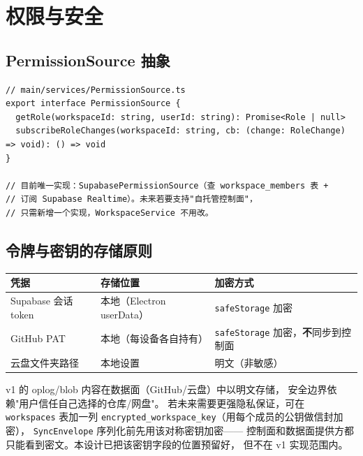 \documentclass[12pt, a4paper]{article}
\begin{document}
\section{权限与安全}

\subsection{PermissionSource 抽象}

\begin{lstlisting}[language={}]
// main/services/PermissionSource.ts
export interface PermissionSource {
  getRole(workspaceId: string, userId: string): Promise<Role | null>
  subscribeRoleChanges(workspaceId: string, cb: (change: RoleChange) => void): () => void
}

// 目前唯一实现：SupabasePermissionSource（查 workspace_members 表 +
// 订阅 Supabase Realtime）。未来若要支持"自托管控制面"，
// 只需新增一个实现，WorkspaceService 不用改。
\end{lstlisting}

\subsection{令牌与密钥的存储原则}

\begin{center}
\begin{tabular}{p{3.5cm} p{4.6cm} p{4.6cm}}
  \toprule
  \textbf{凭据} & \textbf{存储位置} & \textbf{加密方式} \\
  \midrule
  Supabase 会话 token   & 本地（Electron userData） & \texttt{safeStorage} 加密 \\
  GitHub PAT           & 本地（每设备各自持有）    & \texttt{safeStorage} 加密，\textbf{不}同步到控制面 \\
  云盘文件夹路径         & 本地设置                  & 明文（非敏感） \\
  \bottomrule
\end{tabular}
\end{center}

\begin{tcolorbox}[notebox, title={端到端加密（Future Work，非 v1 必须）}]
  v1 的 oplog/blob 内容在数据面（GitHub/云盘）中以明文存储，
  安全边界依赖"用户信任自己选择的仓库/网盘"。
  若未来需要更强隐私保证，可在 \texttt{workspaces} 表加一列
  \texttt{encrypted\_workspace\_key}（用每个成员的公钥做信封加密），
  \texttt{SyncEnvelope} 序列化前先用该对称密钥加密——
  控制面和数据面提供方都只能看到密文。本设计已把该密钥字段的位置预留好，
  但不在 v1 实现范围内。
\end{tcolorbox}
\end{document}
